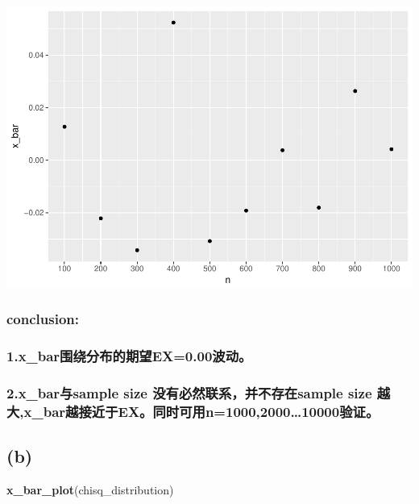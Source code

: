 \documentclass[]{article}
\newenvironment{Shaded}{\begin{snugshade}}{\end{snugshade}}
\newcommand{\KeywordTok}[1]{\textcolor[rgb]{0.13,0.29,0.53}{\textbf{{#1}}}}
\newcommand{\NormalTok}[1]{{#1}}
\begin{document}
\includegraphics{advEconometric_homework_files/figure-latex/unnamed-chunk-2-1.pdf}

\subsubsection{conclusion:}\label{conclusion}

\subsubsection{1.x\_bar围绕分布的期望EX=0.00波动。}\label{xux5fbarex0.00}

\subsubsection{2.x\_bar与sample size 没有必然联系，并不存在sample size
越大,x\_bar越接近于EX。同时可用n=1000,2000\ldots{}10000验证。}\label{xux5fbarsample-size-sample-size-xux5fbarexn1000200010000}

 \newpage

\subsection{(b)}\label{b}

\begin{Shaded}
\begin{Highlighting}[]
\KeywordTok{x_bar_plot}\NormalTok{(chisq_distribution)}
\end{Highlighting}
\end{Shaded}
\end{document}
